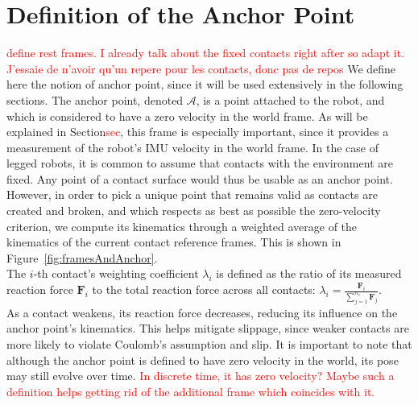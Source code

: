 \documentclass{IJCAS}
\begin{document}
\section{Definition of the Anchor Point}
\textcolor{red}{define rest frames. I already talk about the fixed contacts right after so adapt it.}
\textcolor{red}{J'essaie de n'avoir qu'un repere pour les contacts, donc pas de repos}
We define here the notion of anchor point, since it will be used extensively in the following sections. The anchor point, denoted $\mathcal{A}$, is a point attached to the robot, and which is considered to have a zero velocity in the world frame. As will be explained in Section\textcolor{red}{sec}, this frame is especially important, since it provides a measurement of the robot's IMU velocity in the world frame. In the case of legged robots, it is common to assume that contacts with the environment are fixed. Any point of a contact surface would thus be usable as an anchor point. However, in order to pick a unique point that remains valid as contacts are created and broken, and which respects as best as possible the zero-velocity criterion, we compute its kinematics through a weighted average of the kinematics of the current contact reference frames. This is shown in Figure~\ref{fig:framesAndAnchor}. \\
The $i$-th contact's weighting coefficient $\lambda_{i}$ is defined as the ratio of its measured reaction force $\boldsymbol{F}_{i}$ to the total reaction force across all contacts: $\lambda_{i}=\frac{\boldsymbol{F}_{i}}{\sum^{n_{c}}_{j=1}\boldsymbol{F}_{j}}$. \\ 
As a contact weakens, its reaction force decreases, reducing its influence on the anchor point's kinematics. This helps mitigate slippage, since weaker contacts are more likely to violate Coulomb's assumption and slip. It is important to note that although the anchor point is defined to have zero velocity in the world, its pose may still evolve over time. \textcolor{red}{In discrete time, it has zero velocity? Maybe such a definition helps getting rid of the additional frame which coincides with it.}
\end{document}
